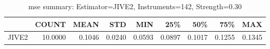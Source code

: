 \begin{table}[ht]
\centering
\caption{mse summary: Estimator=JIVE2, Instruments=142, Strength=0.30}
\begin{tabular}{lrrrrrrrr}
\toprule
 & COUNT & MEAN & STD & MIN & 25\% & 50\% & 75\% & MAX \\
\midrule
JIVE2 & 10.0000 & 0.1046 & 0.0240 & 0.0593 & 0.0897 & 0.1017 & 0.1255 & 0.1345 \\
\bottomrule
\end{tabular}
\end{table}
